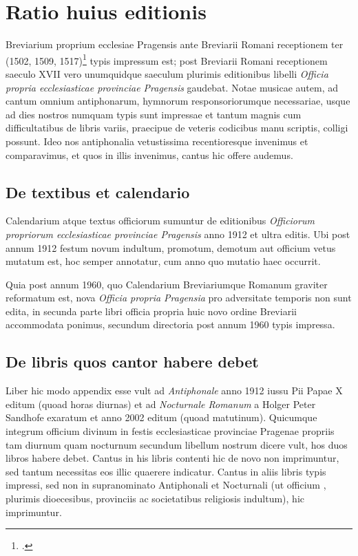 \chapter*{Ratio huius editionis}

Breviarium proprium ecclesiae Pragensis
ante Breviarii Romani receptionem ter
(1502, 1509, 1517)\footcite[242]{bohatta}
typis impressum est; post Breviarii Romani receptionem
saeculo XVII vero unumquidque saeculum plurimis editionibus
libelli \emph{Officia propria ecclesiasticae provinciae Pragensis} gaudebat.
Notae musicae autem, ad cantum omnium antiphonarum, hymnorum
responsoriorumque necessariae,
usque ad dies nostros numquam typis sunt impressae
et tantum magnis cum difficultatibus de libris variis,
praecipue de veteris codicibus manu scriptis,
colligi possunt. Ideo nos antiphonalia vetustissima recentioresque
invenimus et comparavimus, et quos in illis invenimus,
cantus hic offere audemus.

\section*{De textibus et calendario}
Calendarium atque textus officiorum sumuntur de editionibus
\emph{Officiorum propriorum ecclesiasticae provinciae Pragensis}
anno 1912 et ultra editis.
Ubi post annum 1912 festum novum indultum, promotum, demotum
aut officium vetus mutatum est, hoc semper annotatur,
cum anno quo mutatio haec occurrit.

Quia post annum 1960, quo Calendarium Breviariumque Romanum
graviter reformatum est, nova \emph{Officia propria Pragensia}
pro adversitate temporis non sunt edita,
in secunda parte libri officia propria huic novo ordine Breviarii
accommodata ponimus, secundum directoria post annum 1960 typis
impressa.

\section*{De libris quos cantor habere debet}
Liber hic modo appendix esse vult ad \emph{Antiphonale}
anno 1912 iussu Pii Papae X editum (quoad horas diurnas) et
ad \emph{Nocturnale Romanum} a Holger Peter Sandhofe exaratum
et anno 2002 editum (quoad matutinum).
Quicumque integrum officium divinum in festis ecclesiasticae provinciae
Pragenae propriis tam diurnum quam nocturnum secundum
libellum nostrum dicere vult, hos duos libros habere debet.
Cantus in his libris contenti hic de novo non imprimuntur,
sed tantum necessitas eos illic quaerere indicatur.
Cantus in aliis libris typis impressi, sed non in supranominato
Antiphonali et Nocturnali (ut officium
, plurimis dioecesibus,
provinciis ac societatibus religiosis indultum), hic imprimuntur.

